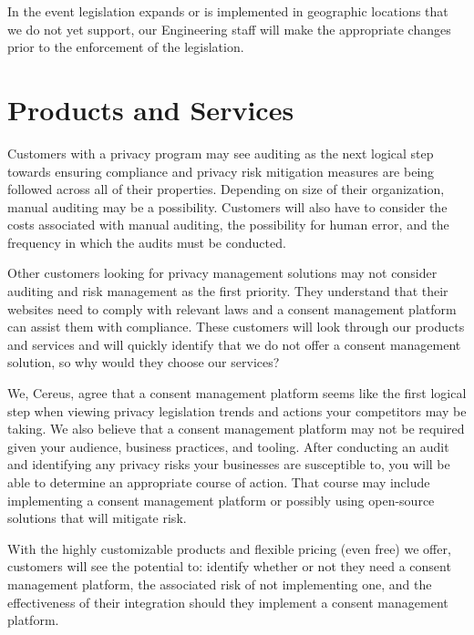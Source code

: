In the event legislation expands or is implemented in geographic locations that we do not yet support, our Engineering staff will make the appropriate changes prior to the enforcement of the legislation.


\section{Products and Services}

Customers with a privacy program may see auditing as the next logical step towards ensuring compliance and privacy risk mitigation measures are being followed across all of their properties. Depending on size of their organization, manual auditing may be a possibility. Customers will also have to consider the costs associated with manual auditing, the possibility for human error, and the frequency in which the audits must be conducted. 

Other customers looking for privacy management solutions may not consider auditing and risk management as the first priority. They understand that their websites need to comply with relevant laws and a consent management platform can assist them with compliance. These customers will look through our products and services and will quickly identify that we do not offer a consent management solution, so why would they choose our services?

We, Cereus, agree that a consent management platform seems like the first logical step when viewing privacy legislation trends and actions your competitors may be taking. We also believe that a consent management platform may not be required given your audience, business practices, and tooling. After conducting an audit and identifying any privacy risks your businesses are susceptible to, you will be able to determine an appropriate course of action. That course may include implementing a consent management platform or possibly using open-source solutions that will mitigate risk.

With the highly customizable products and flexible pricing (even free) we offer, customers will see the potential to: identify whether or not they need a consent management platform, the associated risk of not implementing one, and the effectiveness of their integration should they implement a consent management platform.


